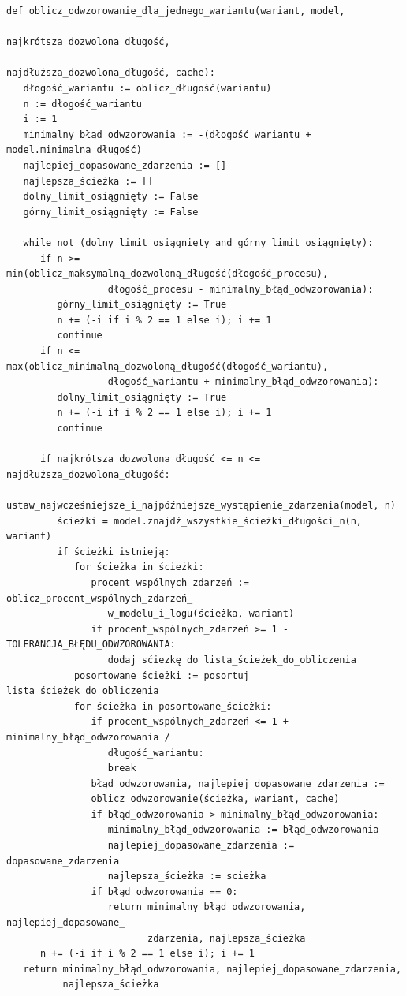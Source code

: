 \lstset{caption=Obliczanie odwzorowania dla jednego wariantu, captionpos=b}
\lstset{label=src:best_result, frame=single}
\begin{lstlisting}
def oblicz_odwzorowanie_dla_jednego_wariantu(wariant, model, 
                                            najkrótsza_dozwolona_długość, 
                                            najdłuższa_dozwolona_długość, cache):
   dłogość_wariantu := oblicz_długość(wariantu)
   n := dłogość_wariantu
   i := 1
   minimalny_błąd_odwzorowania := -(dłogość_wariantu + model.minimalna_długość)
   najlepiej_dopasowane_zdarzenia := []
   najlepsza_ścieżka := []
   dolny_limit_osiągnięty := False
   górny_limit_osiągnięty := False
   
   while not (dolny_limit_osiągnięty and górny_limit_osiągnięty):
      if n >= min(oblicz_maksymalną_dozwoloną_długość(dłogość_procesu), 
                  dłogość_procesu - minimalny_błąd_odwzorowania):
         górny_limit_osiągnięty := True
         n += (-i if i % 2 == 1 else i); i += 1
         continue
      if n <= max(oblicz_minimalną_dozwoloną_długość(dłogość_wariantu), 
                  dłogość_wariantu + minimalny_błąd_odwzorowania):
         dolny_limit_osiągnięty := True
         n += (-i if i % 2 == 1 else i); i += 1
         continue
         
      if najkrótsza_dozwolona_długość <= n <= najdłuższa_dozwolona_długość:
         ustaw_najwcześniejsze_i_najpóźniejsze_wystąpienie_zdarzenia(model, n)
         ścieżki = model.znajdź_wszystkie_ścieżki_długości_n(n, wariant)
         if ścieżki istnieją:
            for ścieżka in ścieżki:
               procent_wspólnych_zdarzeń := oblicz_procent_wspólnych_zdarzeń_
                  w_modelu_i_logu(ścieżka, wariant)
               if procent_wspólnych_zdarzeń >= 1 - TOLERANCJA_BŁĘDU_ODWZOROWANIA:
                  dodaj sćiezkę do lista_ścieżek_do_obliczenia
            posortowane_ścieżki := posortuj lista_ścieżek_do_obliczenia
            for ścieżka in posortowane_ścieżki:
               if procent_wspólnych_zdarzeń <= 1 + minimalny_błąd_odwzorowania /
                  długość_wariantu:
                  break
               błąd_odwzorowania, najlepiej_dopasowane_zdarzenia :=
               oblicz_odwzorowanie(ścieżka, wariant, cache)
               if błąd_odwzorowania > minimalny_błąd_odwzorowania:
                  minimalny_błąd_odwzorowania := błąd_odwzorowania
                  najlepiej_dopasowane_zdarzenia := dopasowane_zdarzenia
                  najlepsza_ścieżka := scieżka
               if błąd_odwzorowania == 0:
                  return minimalny_błąd_odwzorowania, najlepiej_dopasowane_
                         zdarzenia, najlepsza_ścieżka
      n += (-i if i % 2 == 1 else i); i += 1
   return minimalny_błąd_odwzorowania, najlepiej_dopasowane_zdarzenia, 
          najlepsza_ścieżka
\end{lstlisting}

